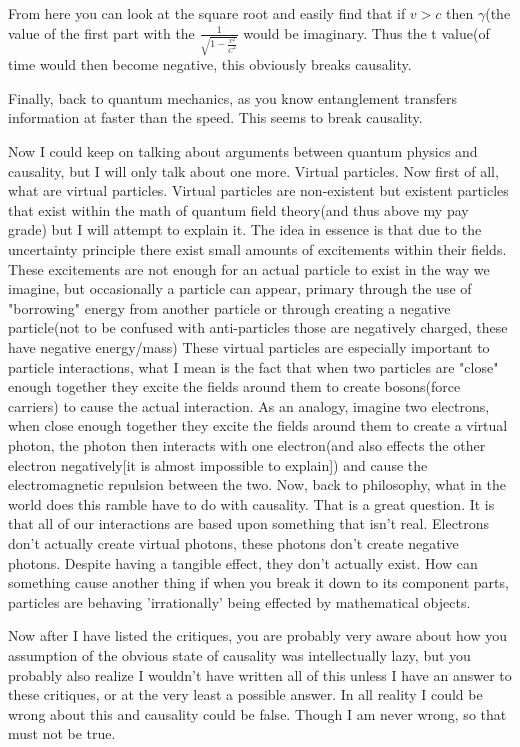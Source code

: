 \par From here you can look at the square root and easily find that if $v>c$ then $\gamma $(the value of the first part with the $\frac{1}{\sqrt{1-\frac{v^2}{C^2}}}$ would be imaginary. Thus the t value(of time would then become negative, this obviously breaks causality.
\par Finally, back to quantum mechanics, as you know entanglement transfers information at faster than the speed. This seems to break causality.
\par Now I could keep on talking about arguments between quantum physics and causality, but I will only talk about one more. Virtual particles. Now first of all, what are virtual particles. Virtual particles are non-existent but existent particles that exist within the math of quantum field theory(and thus above my pay grade) but I will attempt to explain it. The idea in essence is that due to the uncertainty principle there exist small amounts of excitements within their fields. These excitements are not enough for an actual particle to exist in the way we imagine, but occasionally a particle can appear, primary through the use of "borrowing" energy from another particle or through creating a negative particle(not to be confused with anti-particles those are negatively charged, these have negative energy/mass) These virtual particles are especially important to particle interactions, what I mean is the fact that when two particles are "close" enough together they excite the fields around them to create bosons(force carriers) to cause the actual interaction. As an analogy, imagine two electrons, when close enough together they excite the fields around them to create a virtual photon, the photon then interacts with one electron(and also effects the other electron negatively[it is almost impossible to explain]) and cause the electromagnetic repulsion between the two. Now, back to philosophy, what in the world does this ramble have to do with causality. That is a great question. It is that all of our interactions are based upon something that isn't real. Electrons don't actually create virtual photons, these photons don't create negative photons. Despite having a tangible effect, they don't actually exist. How can something cause another thing if when you break it down to its component parts, particles are behaving 'irrationally' being effected by mathematical objects.

\par Now after I have listed the critiques, you are probably very aware about how you assumption of the obvious state of causality was intellectually lazy, but you probably also realize I wouldn't have written all of this unless I have an answer to these critiques, or at the very least a possible answer. In all reality I could be wrong about this and causality could be false. Though I am never wrong, so that must not be true.

